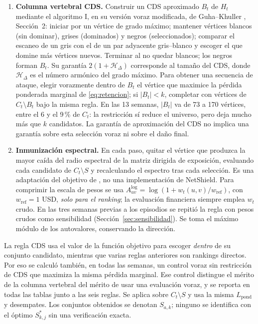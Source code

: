 \documentclass[journal]{IEEEtran}
\begin{document}
\begin{enumerate}
\item \textbf{Columna vertebral CDS.} Construir un CDS aproximado $B_t$ de
      $H_t$ mediante el algoritmo I, en su versión voraz modificada, de
      Guha--Khuller \cite{guha1998approximation}, Sección~2: iniciar por un
      vértice de grado máximo; mantener vértices blancos (sin dominar), grises
      (dominados) y negros (seleccionados); comparar el escaneo de un gris con
      el de un par adyacente gris--blanco y escoger el que domine más vértices
      nuevos. Terminar al no quedar blancos; los negros forman $B_t$.
      Su garantía $2(1+\mathcal H_\Delta)$ corresponde al tamaño del CDS,
      donde $\mathcal H_\Delta$ es el número armónico del grado máximo.
      Para obtener una secuencia de ataque,
      elegir vorazmente dentro de $B_t$ el vértice que maximice la pérdida
      ponderada marginal de \eqref{eq:retencion}; si $|B_t|<k$, completar con
      vértices de $C_t\setminus B_t$ bajo la misma regla. En las 13 semanas,
      $|B_t|$ va de 73 a 170 vértices, entre el 6 y el 9\,\% de $C_t$: la
      restricción sí reduce el universo, pero deja mucho más que $k$
      candidatos. La
      garantía de aproximación del CDS no implica una garantía sobre esta
      selección voraz ni sobre el daño final.

\item \textbf{Inmunización espectral.} En cada paso, quitar el vértice que
      produzca la mayor caída del radio espectral de la matriz dirigida de
      exposición, evaluando cada candidato de $C_t\setminus S$ y recalculando
      el espectro tras cada selección. Es una adaptación del objetivo de
      \cite{chen2016node}, no una implementación de NetShield. Para comprimir
      la escala de pesos se usa $A^{\log}_{uv}=\log(1+w_t(u,v)/w_{\mathrm{ref}})$,
      con $w_{\mathrm{ref}}=1$ USD, \emph{solo para el
      ranking}; la evaluación financiera siempre emplea $w_t$ crudo. En las
      tres semanas previas a los episodios se repitió la regla con pesos
      crudos como sensibilidad (Sección~\ref{sec:sensibilidad}).
      Se toma el máximo módulo de los autovalores, conservando la dirección.
\end{enumerate}

La regla CDS usa el valor de la función objetivo para escoger \emph{dentro}
de su conjunto candidato, mientras que varias reglas anteriores son rankings
directos. Por eso se calculó también, en todas las semanas, un control voraz
sin restricción de CDS que maximiza la misma pérdida marginal. Ese control
distingue el mérito de la columna vertebral del mérito de usar una evaluación
voraz, y se reporta en todas las tablas junto a las seis reglas. Se aplica sobre $C_t\setminus S$ y usa la misma
$L_{\mathrm{pond}}$ y desempates. Los conjuntos obtenidos se denotan $S_{a,k}$;
ninguno se identifica con el óptimo $S^{\ast}_{k,j}$ sin una verificación exacta.
\end{document}

